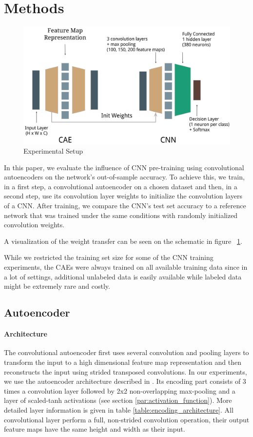 \documentclass{article}
\begin{document}
\section{Methods}

  \begin{figure}%
    \centering
    \includegraphics[width=0.6\linewidth]{../graphics/setup.png}
    \caption{Experimental Setup}
    \label{fig:experimental_setup}
  \end{figure}

  In this paper, we evaluate the influence of CNN pre-training using convolutional autoencoders on the network's out-of-sample accuracy. To achieve this, we train, in a first step, a convolutional autoencoder on a chosen dataset and then, in a second step, use its convolution layer weights to initialize the convolution layers of a CNN. After training, we compare the CNN's test set accuracy to a reference network that was trained under the same conditions with randomly initialized convolution weights. 

  A visualization of the weight transfer can be seen on the schematic in figure ~\ref{fig:experimental_setup}. 

  While we restricted the training set size for some of the CNN training experiments, the CAEs were always trained on all available training data since in a lot of settings, additional unlabeled data is easily available while labeled data might be extremely rare and costly.  

  \subsection{Autoencoder}
  \label{sec:methods_autoencoder}

    \paragraph{Architecture}
    The convolutional autoencoder first uses several convolution and pooling layers to transform the input to a high dimensional feature map representation and then reconstructs the input using strided transposed convolutions.
    In our experiments, we use the autoencoder architecture described in \citep{masci2011stacked}. Its encoding part consists of 3 times a convolution layer followed by 2x2 non-overlapping max-pooling and a layer of scaled-tanh activations (see section \ref{par:activation_function}). More detailed layer information is given in table \ref{table:encoding_architecture}. All convolutional layer perform a full, non-strided convolution operation, their output feature maps have the same height and width as their input.
\end{document}
